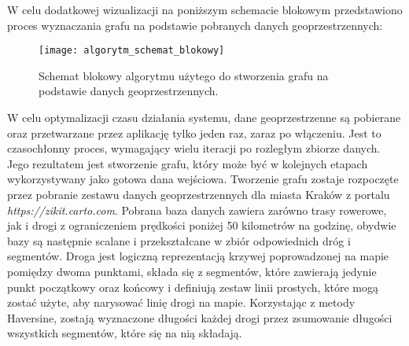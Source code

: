 W celu dodatkowej wizualizacji na poniższym schemacie blokowym przedstawiono proces wyznaczania grafu na podstawie pobranych danych geoprzestrzennych:

\begin{figure}[H]
\centering
\texttt{[image: algorytm\_schemat\_blokowy]}
\caption{Schemat blokowy algorytmu użytego do stworzenia grafu na podstawie danych geoprzestrzennych.}
\end{figure}

W celu optymalizacji czasu działania systemu, dane geoprzestrzenne są pobierane oraz przetwarzane przez aplikację tylko jeden raz, zaraz po włączeniu. Jest to czasochłonny proces, wymagający wielu iteracji po rozległym zbiorze danych. Jego rezultatem jest stworzenie grafu, który może być w kolejnych etapach wykorzystywany jako gotowa dana wejściowa. Tworzenie grafu zostaje rozpoczęte przez pobranie zestawu danych geoprzestrzennych dla miasta Kraków z portalu \textit{https://zikit.carto.com}. Pobrana baza danych zawiera zarówno trasy rowerowe, jak i drogi z ograniczeniem prędkości poniżej 50 kilometrów na godzinę, obydwie bazy są następnie scalane i przekształcane w zbiór odpowiednich dróg i segmentów. Droga jest logiczną reprezentacją krzywej poprowadzonej na mapie pomiędzy dwoma punktami, składa się z segmentów, które zawierają jedynie punkt początkowy oraz końcowy i definiują zestaw linii prostych, które mogą zostać użyte, aby narysować linię drogi na mapie. Korzystając z metody Haversine, zostają wyznaczone długości każdej drogi przez zsumowanie długości wszystkich segmentów, które się na nią składają. \newline
